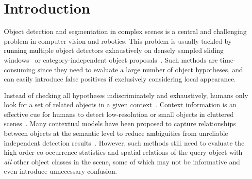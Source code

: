 \section{Introduction}

Object detection and segmentation in complex scenes is a central and challenging problem in computer vision and robotics.
This problem is usually tackled by running multiple object detectors exhaustively on densely sampled sliding windows~\cite{felzenszwalb2010object} or category-independent object proposals~\cite{carreira2012cpmc,van2011segmentation,arbelaez2014multiscale}. 
Such methods are time-consuming since they need to evaluate a large number of object hypotheses, and can easily introduce false positives if exclusively considering local appearance.

Instead of checking all hypotheses indiscriminately and exhaustively, humans only look for a set of related objects in a given context~\cite{biederman1982scene, hock1974contextual}. Context information is an effective cue for humans to detect low-resolution or small objects in cluttered scenes~\cite{parikh2012exploring}. Many contextual models have been proposed to capture relationships between objects at the semantic level to reduce ambiguities from
unreliable independent detection results~\cite{gould2009decomposing, ladicky2010graph}. %
However, such methods still need to evaluate the high order co-occurrence statistics and spatial relations of the query object with \emph{all} other object classes in the scene, some of which may not be informative and even introduce unnecessary confusion.  

